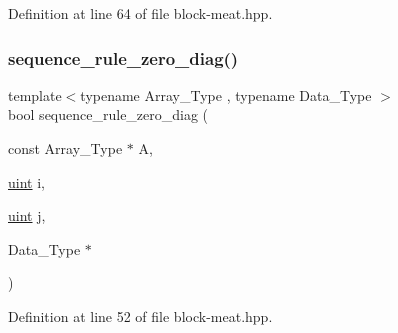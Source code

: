 Definition at line 64 of file block-\/meat.\+hpp.

\mbox{\label{block-meat_8hpp_a0d46af0e4cb648e744267bc926870c56}} 
\subsubsection{\texorpdfstring{sequence\+\_\+rule\+\_\+zero\+\_\+diag()}{sequence\_rule\_zero\_diag()}}
{\footnotesize\ttfamily template$<$typename Array\+\_\+\+Type , typename Data\+\_\+\+Type $>$ \\
bool sequence\+\_\+rule\+\_\+zero\+\_\+diag (\begin{DoxyParamCaption}\item[{const Array\+\_\+\+Type $\ast$}]{A,  }\item[{\hyperlink{typedefs_8hpp_a91ad9478d81a7aaf2593e8d9c3d06a14}{uint}}]{i,  }\item[{\hyperlink{typedefs_8hpp_a91ad9478d81a7aaf2593e8d9c3d06a14}{uint}}]{j,  }\item[{Data\+\_\+\+Type $\ast$}]{ }\end{DoxyParamCaption})\hspace{0.3cm}{\ttfamily [inline]}}



Definition at line 52 of file block-\/meat.\+hpp.

